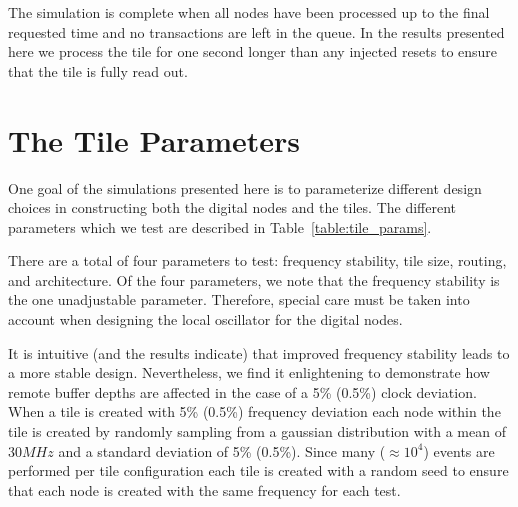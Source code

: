 The simulation is complete when all nodes have been processed up to the final requested time and no transactions are left in the queue. 
In the results presented here we process the tile for one second longer than any injected resets to ensure that the tile is fully read out.

\section{The Tile Parameters}

One goal of the simulations presented here is to parameterize different design choices in constructing both the digital nodes and the tiles.
The different parameters which we test are described in Table~\ref{table:tile_params}.

There are a total of four parameters to test: frequency stability, tile size, routing, and architecture.
Of the four parameters, we note that the frequency stability is the one unadjustable parameter.
Therefore, special care must be taken into account when designing the local oscillator for the digital nodes.

It is intuitive (and the results indicate) that improved frequency stability leads to a more stable design.
Nevertheless, we find it enlightening to demonstrate how remote buffer depths are affected in the case of a 5\% (0.5\%) clock deviation.
When a tile is created with 5\% (0.5\%) frequency deviation each node within the tile is created by randomly sampling from a gaussian distribution with a mean of 30$\unit{MHz}$ and a standard deviation of 5\% (0.5\%).
Since many ($\approx 10^4$) events are performed per tile configuration each tile is created with a random seed to ensure that each node is created with the same frequency for each test.

